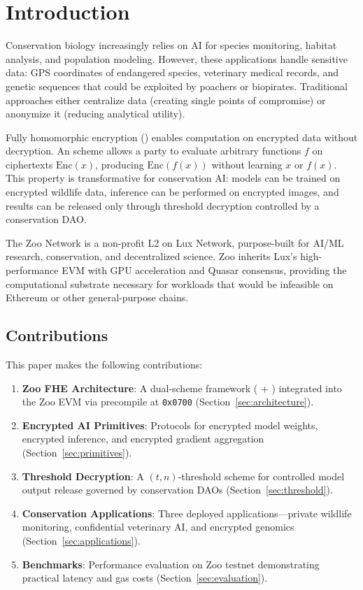\section{Introduction}


Conservation biology increasingly relies on AI for species monitoring, habitat analysis, and population modeling. However, these applications handle sensitive data: GPS coordinates of endangered species, veterinary medical records, and genetic sequences that could be exploited by poachers or biopirates. Traditional approaches either centralize data (creating single points of compromise) or anonymize it (reducing analytical utility).

Fully homomorphic encryption (\FHE{}) enables computation on encrypted data without decryption. An \FHE{} scheme allows a party to evaluate arbitrary functions $f$ on ciphertexts $\text{Enc}(x)$, producing $\text{Enc}(f(x))$ without learning $x$ or $f(x)$. This property is transformative for conservation AI: models can be trained on encrypted wildlife data, inference can be performed on encrypted images, and results can be released only through threshold decryption controlled by a conservation DAO.

The Zoo Network is a non-profit L2 on Lux Network, purpose-built for AI/ML research, conservation, and decentralized science. Zoo inherits Lux's high-performance EVM with GPU acceleration and Quasar consensus, providing the computational substrate necessary for \FHE{} workloads that would be infeasible on Ethereum or other general-purpose chains.

\subsection{Contributions}

This paper makes the following contributions:

\begin{enumerate}
    \item \textbf{Zoo FHE Architecture}: A dual-scheme \FHE{} framework (\TFHE{} + \CKKS{}) integrated into the Zoo EVM via precompile at \texttt{0x0700} (Section~\ref{sec:architecture}).

    \item \textbf{Encrypted AI Primitives}: Protocols for encrypted model weights, encrypted inference, and encrypted gradient aggregation (Section~\ref{sec:primitives}).

    \item \textbf{Threshold Decryption}: A $(t, n)$-threshold scheme for controlled model output release governed by conservation DAOs (Section~\ref{sec:threshold}).

    \item \textbf{Conservation Applications}: Three deployed applications---private wildlife monitoring, confidential veterinary AI, and encrypted genomics (Section~\ref{sec:applications}).

    \item \textbf{Benchmarks}: Performance evaluation on Zoo testnet demonstrating practical latency and gas costs (Section~\ref{sec:evaluation}).
\end{enumerate}

